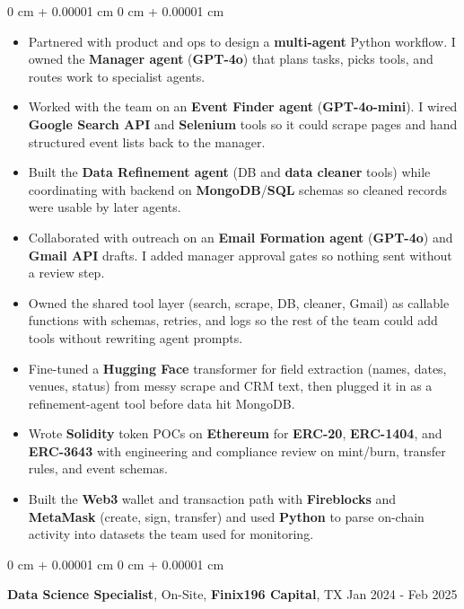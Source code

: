 \documentclass[10pt, letterpaper]{article}
\newenvironment{highlights}{
    \begin{itemize}[
        topsep=0.10 cm,
        parsep=0.10 cm,
        partopsep=0pt,
        itemsep=0pt,
        leftmargin=0 cm + 10pt
    ]
}{
    \end{itemize}
} %
\newenvironment{onecolentry}{
    \begin{adjustwidth}{
        0 cm + 0.00001 cm
    }{
        0 cm + 0.00001 cm
    }
}{
    \end{adjustwidth}
} %
\newcommand{\resumeheading}[2]{%
    \begin{onecolentry}
        #1 \hfill #2
    \end{onecolentry}
} %
\begin{document}
\begin{onecolentry}
\begin{highlights}
	\item Partnered with product and ops to design a \textbf{multi-agent} Python workflow. I owned the \textbf{Manager agent} (\textbf{GPT-4o}) that plans tasks, picks tools, and routes work to specialist agents.
	\item Worked with the team on an \textbf{Event Finder agent} (\textbf{GPT-4o-mini}). I wired \textbf{Google Search API} and \textbf{Selenium} tools so it could scrape pages and hand structured event lists back to the manager.
	\item Built the \textbf{Data Refinement agent} (DB and \textbf{data cleaner} tools) while coordinating with backend on \textbf{MongoDB}/\textbf{SQL} schemas so cleaned records were usable by later agents.
	\item Collaborated with outreach on an \textbf{Email Formation agent} (\textbf{GPT-4o}) and \textbf{Gmail API} drafts. I added manager approval gates so nothing sent without a review step.
	\item Owned the shared tool layer (search, scrape, DB, cleaner, Gmail) as callable functions with schemas, retries, and logs so the rest of the team could add tools without rewriting agent prompts.
	\item Fine-tuned a \textbf{Hugging Face} transformer for field extraction (names, dates, venues, status) from messy scrape and CRM text, then plugged it in as a refinement-agent tool before data hit MongoDB.
	\item Wrote \textbf{Solidity} token POCs on \textbf{Ethereum} for \textbf{ERC-20}, \textbf{ERC-1404}, and \textbf{ERC-3643} with engineering and compliance review on mint/burn, transfer rules, and event schemas.
	\item Built the \textbf{Web3} wallet and transaction path with \textbf{Fireblocks} and \textbf{MetaMask} (create, sign, transfer) and used \textbf{Python} to parse on-chain activity into datasets the team used for monitoring.
\end{highlights}
\end{onecolentry}


\vspace{0.15 cm}
\resumeheading{\textbf{Data Science Specialist}, On-Site, \textbf{Finix196 Capital}, TX}{Jan 2024 - Feb 2025}
\end{document}
